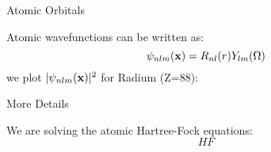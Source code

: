 \documentclass{beamer}
\begin{document}
\begin{frame}{Atomic Orbitals}

Atomic wavefunctions can be written as:
\[
    \psi_{nlm}({\bf x}) = R_{nl}(r) Y_{lm}(\Omega)
\]
we plot $| \psi_{nlm}({\bf x})|^2$ for Radium (Z=88):

\end{frame}

\begin{frame}{More Details}

We are solving the atomic Hartree-Fock equations:
\[
    HF
\]

\end{frame}
\end{document}
